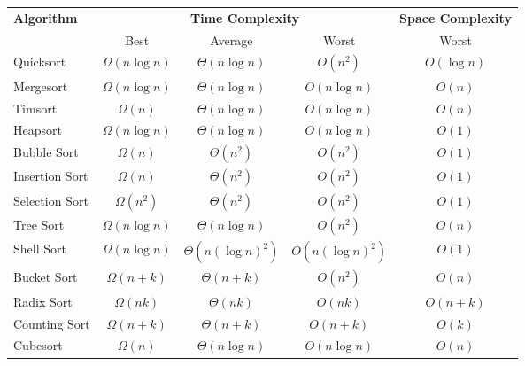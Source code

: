 \documentclass[8pt, table, xcdraw]{article}%
\begin{document}
\begin{table}[htbp]
    \centering
    \begin{tabular}{|l|c|c|c|c|}
        \hline
        \textbf{Algorithm} & \multicolumn{3}{c|}{\textbf{Time Complexity}} & \textbf{Space Complexity} \\ \cline{2-4}
        & Best & Average & Worst & Worst \\ \hline
        Quicksort & \cellcolor{orange!30}$\Omega(n \log n)$ & \cellcolor{orange!30}$\Theta(n \log n)$ & \cellcolor{red!30}$O(n^2)$ & \cellcolor{yellowgreen!30}$O(\log n)$ \\ \hline
        Mergesort & \cellcolor{orange!30}$\Omega(n \log n)$ & \cellcolor{orange!30}$\Theta(n \log n)$ & \cellcolor{orange!30}$O(n \log n)$ & \cellcolor{yellow!30}$O(n)$ \\ \hline
        Timsort & \cellcolor{yellow!30}$\Omega(n)$ & \cellcolor{orange!30}$\Theta(n \log n)$ & \cellcolor{orange!30}$O(n \log n)$ & \cellcolor{yellow!30}$O(n)$ \\ \hline
        Heapsort & \cellcolor{orange!30}$\Omega(n \log n)$ & \cellcolor{orange!30}$\Theta(n \log n)$ & \cellcolor{orange!30}$O(n \log n)$ & \cellcolor{green!30}$O(1)$ \\ \hline
        Bubble Sort & \cellcolor{yellow!30}$\Omega(n)$ & \cellcolor{red!30}$\Theta(n^2)$ & \cellcolor{red!30}$O(n^2)$ & \cellcolor{green!30}$O(1)$ \\ \hline
        Insertion Sort & \cellcolor{yellow!30}$\Omega(n)$ & \cellcolor{red!30}$\Theta(n^2)$ & \cellcolor{red!30}$O(n^2)$ & \cellcolor{green!30}$O(1)$ \\ \hline
        Selection Sort & \cellcolor{red!30}$\Omega(n^2)$ & \cellcolor{red!30}$\Theta(n^2)$ & \cellcolor{red!30}$O(n^2)$ & \cellcolor{green!30}$O(1)$ \\ \hline
        Tree Sort & \cellcolor{orange!30}$\Omega(n \log n)$ & \cellcolor{orange!30}$\Theta(n \log n)$ & \cellcolor{red!30}$O(n^2)$ & \cellcolor{yellow!30}$O(n)$ \\ \hline
        Shell Sort & \cellcolor{orange!30}$\Omega(n \log n)$ & \cellcolor{red!30}$\Theta(n(\log n)^2)$ & \cellcolor{red!30}$O(n(\log n)^2)$ & \cellcolor{green!30}$O(1)$ \\ \hline
        Bucket Sort & \cellcolor{green!30}$\Omega(n+k)$ & \cellcolor{green!30}$\Theta(n+k)$ & \cellcolor{red!30}$O(n^2)$ & \cellcolor{yellow!30}$O(n)$ \\ \hline
        Radix Sort & \cellcolor{green!30}$\Omega(nk)$ & \cellcolor{green!30}$\Theta(nk)$ & \cellcolor{green!30}$O(nk)$ & \cellcolor{yellow!30}$O(n+k)$ \\ \hline
        Counting Sort & \cellcolor{green!30}$\Omega(n+k)$ & \cellcolor{green!30}$\Theta(n+k)$ & \cellcolor{green!30}$O(n+k)$ & \cellcolor{yellow!30}$O(k)$ \\ \hline
        Cubesort & \cellcolor{yellow!30}$\Omega(n)$ & \cellcolor{orange!30}$\Theta(n \log n)$ & \cellcolor{orange!30}$O(n \log n)$ & \cellcolor{yellow!30}$O(n)$ \\ \hline
    \end{tabular}
    \label{tab:complexity}
\end{table}
\end{document}
